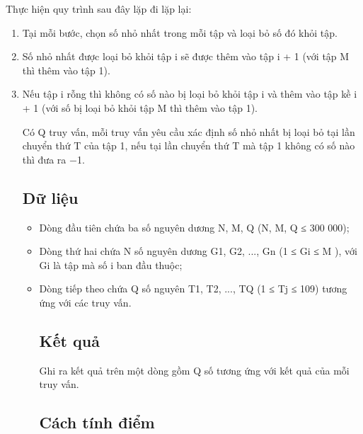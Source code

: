 Thực hiện quy trình sau đây lặp đi lặp lại:

\hfill\break

\begin{enumerate}
\item
  Tại mỗi bước, chọn số nhỏ nhất trong mỗi tập và loại bỏ số đó khỏi
  tập.
\item
  Số nhỏ nhất được loại bỏ khỏi tập {i }sẽ được thêm vào tập {i }{+ 1
  }(với tập {M }thì thêm vào tập {1}).
\item
  Nếu tập {i }rỗng thì không có số nào bị loại bỏ khỏi tập {i }và thêm
  vào tập kề {i }{+ 1 }(với số bị loại bỏ khỏi tập {M }thì thêm vào tập
  {1}).

  \hfill\break

  Có {Q }truy vấn, mỗi truy vấn yêu cầu xác định số nhỏ nhất bị loại bỏ
  tại lần chuyển thứ {T }của tập {1}, nếu tại lần chuyển thứ {T }mà tập
  {1 }không có số nào thì đưa ra {−}{1}.

  \subsection{Dữ liệu}\label{dux1eef-liux1ec7u-2}

  \hfill\break

  \begin{itemize}
  \item
    {Dòng đầu tiên chứa ba số nguyên dương }N, M, Q {(}N, M, Q {≤ }{300
    000)}{;}
  \item
    {Dòng thứ hai chứa }N {số nguyên dương }G{1}, G{2}, ..., G{n} {(1
    }{≤ }G{i} {≤ }M {)}{, với }G{i} {là tập mà số }i {ban đầu thuộc;}
  \item
    {Dòng tiếp theo chứa }Q {số nguyên }T{1}, T{2}, ..., T{Q} {(1 }{≤
    }T{j} {≤ }{10}{9}{) }{tương ứng với các truy vấn.}

    \hfill\break

    \subsection{Kết quả}\label{kux1ebft-quux1ea3-2}

    Ghi ra kết quả trên một dòng gồm {Q }số tương ứng với kết quả của
    mỗi truy vấn.

    \subsection{Cách tính điểm}\label{cuxe1ch-tuxednh-ux111iux1ec3m-2}


\end{itemize}
\end{enumerate}
